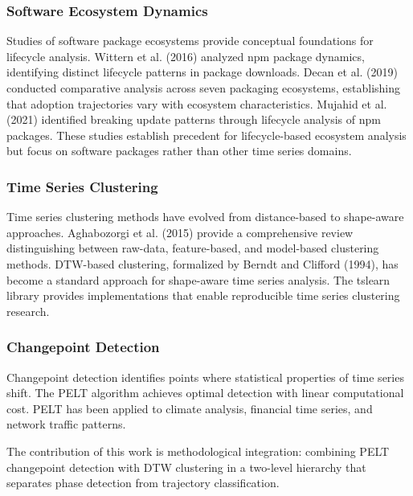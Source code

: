 
\subsubsection{Software Ecosystem Dynamics}

Studies of software package ecosystems provide conceptual foundations for lifecycle analysis. Wittern et al. (2016) analyzed npm package dynamics, identifying distinct lifecycle patterns in package downloads. Decan et al. (2019) conducted comparative analysis across seven packaging ecosystems, establishing that adoption trajectories vary with ecosystem characteristics. Mujahid et al. (2021) identified breaking update patterns through lifecycle analysis of npm packages. These studies establish precedent for lifecycle-based ecosystem analysis but focus on software packages rather than other time series domains.

\subsubsection{Time Series Clustering}

Time series clustering methods have evolved from distance-based to shape-aware approaches. Aghabozorgi et al. (2015) provide a comprehensive review distinguishing between raw-data, feature-based, and model-based clustering methods. DTW-based clustering, formalized by Berndt and Clifford (1994), has become a standard approach for shape-aware time series analysis. The tslearn library \citep{Tavenard2020tslearn} provides implementations that enable reproducible time series clustering research.

\subsubsection{Changepoint Detection}

Changepoint detection identifies points where statistical properties of time series shift. The PELT algorithm \citep{Killick2012Optimal} achieves optimal detection with linear computational cost. PELT has been applied to climate analysis, financial time series, and network traffic patterns.

The contribution of this work is methodological integration: combining PELT changepoint detection with DTW clustering in a two-level hierarchy that separates phase detection from trajectory classification.
